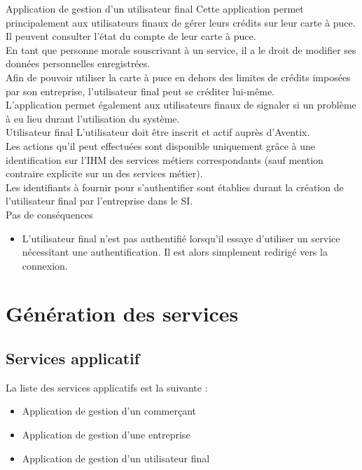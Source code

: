 \CUBref
{Application de gestion d'un utilisateur final}
{
  Cette application permet principalement aux utilisateurs finaux de gérer leurs
  crédits sur leur carte à puce. \\

  Il peuvent consulter l'état du compte de leur carte à puce. \\

  En tant que personne morale souscrivant à un service, il a le droit de
  modifier ses données personnelles enregistrées. \\

  Afin de pouvoir utiliser la carte à puce en dehors des limites de crédits
  imposées par son entreprise, l'utilisateur final peut se créditer lui-même. \\

  L'application permet également aux utilisateurs finaux de signaler si un
  problème à eu lieu durant l'utilisation du système. \\
}
{Utilisateur final}
{
  L'utilisateur doit être inscrit et actif auprès d'Aventix. \\

  Les actions qu'il peut effectuées sont disponible uniquement grâce à une
  identification sur l'IHM des services métiers correspondants (sauf mention
  contraire explicite sur un des services métier). \\

  Les identifiants à fournir pour s'authentifier sont établies durant
  la création de l'utilisateur final par l'entreprise dans le SI. \\
}
{Pas de conséquences}
{
  \begin{itemize}
    \item L'utilisateur final n'est pas authentifié lorsqu'il essaye d'utiliser
      un service nécessitant une authentification. Il est alors simplement
      redirigé vers la connexion.
  \end{itemize}
}

\section{Génération des services}
\subsection{Services applicatif}
La liste des services applicatifs est la suivante : \\
\begin{itemize}
  \item Application de gestion d'un commerçant
  \item Application de gestion d'une entreprise
  \item Application de gestion d'un utilisateur final
\end{itemize}
~\\

